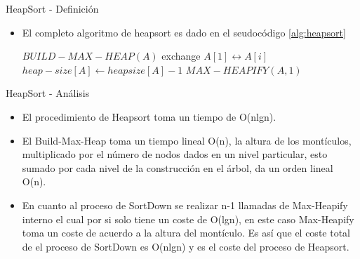 \documentclass[11pt]{beamer}
\begin{document}
    		\begin{frame}{HeapSort - Definición}
    		     \begin{itemize}
    		         \item El completo algoritmo de heapsort es dado en el seudoc\'{o}digo \ref{alg:heapsort}
    		         
    		        \begin{algorithm}[H]
                        \begin{algorithmic}[1]
                            \STATE $BUILD-MAX-HEAP(A)$
                                \STATE exchange $A[1] \leftrightarrow A[i]$
                                \STATE $heap-size[A] \leftarrow heapsize[A]-1$
                                \STATE $MAX-HEAPIFY(A,1)$
                            \ENDFOR
                        \end{algorithmic}
                        \caption{Heapsort(A)}
                        \label{alg:heapsort}
                    \end{algorithm}
    		     \end{itemize}
    		\end{frame}
    		\begin{frame}{HeapSort - Análisis}
    		     \begin{itemize}
    		         \item El procedimiento de Heapsort toma un tiempo de O(nlgn).
    		         
                     \item El Build-Max-Heap toma un tiempo lineal O(n), la altura de los mont\'{i}culos, multiplicado por el n\'{u}mero de nodos dados en un nivel particular, esto sumado por cada nivel de la construcción en el \'{a}rbol, da un orden lineal O(n).
                            
                     \item En cuanto al proceso de SortDown se realizar n-1 llamadas de Max-Heapify interno el cual por si solo tiene un coste de O(lgn), en este caso Max-Heapify toma un coste de acuerdo a la altura del montículo. Es así que el coste total de el proceso de SortDown es O(nlgn) y es el coste del proceso de Heapsort.
    		     \end{itemize}
    		\end{frame}
\end{document}
